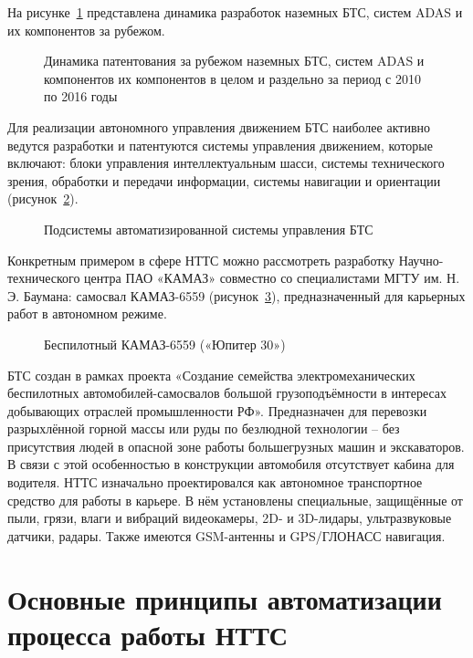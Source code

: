 На рисунке~\cref{fig:patent} представлена динамика разработок наземных БТС, систем ADAS и их компонентов за рубежом.

\begin{figure}[ht]
    \caption{Динамика патентования за рубежом наземных БТС, систем ADAS и компонентов их компонентов в целом и раздельно за период с 2010 по 2016 годы}\label{fig:patent}
\end{figure}

Для реализации автономного управления движением БТС наиболее активно ведутся разработки и патентуются системы управления движением, которые включают: блоки управления интеллектуальным шасси, системы технического зрения, обработки и передачи информации, системы навигации и ориентации (рисунок~\cref{fig:system}). 

\begin{figure}[ht]
    \caption{Подсистемы автоматизированной системы управления БТС}\label{fig:system}
\end{figure}

Конкретным примером в сфере НТТС можно рассмотреть разработку Научно-технического центра ПАО «КАМАЗ» совместно со специалистами МГТУ им. Н. Э. Баумана: самосвал КАМАЗ-6559 (рисунок~\cref{fig:ypiter30}), предназначенный для карьерных работ в автономном режиме.

\begin{figure}[ht]
    \caption{Беспилотный КАМАЗ-6559 («Юпитер 30»)}\label{fig:ypiter30}
\end{figure}

БТС создан в рамках проекта «Создание семейства электромеханических беспилотных автомобилей-самосвалов большой грузоподъёмности в интересах добывающих отраслей промышленности РФ». Предназначен для перевозки разрыхлённой горной массы или руды по безлюдной технологии – без присутствия людей в опасной зоне работы большегрузных машин и экскаваторов. В связи с этой особенностью в конструкции автомобиля отсутствует кабина для водителя. НТТС изначально проектировался как автономное транспортное средство для работы в карьере. В нём установлены специальные, защищённые от пыли, грязи, влаги и вибраций видеокамеры, 2D- и 3D-лидары, ультразвуковые датчики, радары. Также имеются GSM-антенны и GPS/ГЛОНАСС навигация.

\section{Основные принципы автоматизации процесса работы НТТС}\label{sec:ch1/sec2}

